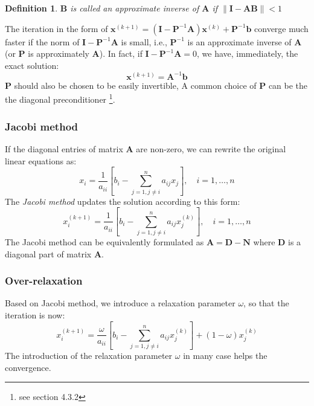 \documentclass{article}
\newtheorem*{definition}{Definition}
\begin{document}
\begin{definition}
    $\mathbf{B}$ is called an approximate inverse of $\mathbf{A}$ if 
    $\|\mathbf{I} - \mathbf{A}\mathbf{B}\| < 1$
\end{definition}
The iteration in the form of 
$\mathbf{x}^{(k+1)} = \left( \mathbf{I} - \mathbf{P}^{-1}\mathbf{A}  \right) \mathbf{x}^{(k)} + \mathbf{P}^{-1} \mathbf{b} $
converge much faster if the norm of $\mathbf{I} - \mathbf{P}^{-1}\mathbf{A}$ is small, 
i.e., $\mathbf{P}^{-1}$ is an approximate inverse of $\mathbf{A}$ (or $\mathbf{P}$ is approximately $\mathbf{A}$). 
In fact, if $\mathbf{I} - \mathbf{P}^{-1}\mathbf{A} = 0$,
we have, immediately, the exact solution:
\begin{equation*}
    \mathbf{x}^{(k+1)} = \mathbf{A}^{-1} \mathbf{b}
\end{equation*}
$\mathbf{P}$ should also be chosen to be easily invertible,
A common choice of $\mathbf{P}$ can be the the diagonal preconditioner
\footnote{see section 4.3.2}. 

\subsubsection{Jacobi method}
If the diagonal entries of matrix $\mathbf{A}$ are non-zero, we can rewrite the 
original linear equations as:
\begin{equation*}
    x_i = \frac{1}{a_{ii}}\left[
        b_i - \sum_{j=1, j\neq i}^n a_{ij}x_j
    \right], \quad i = 1, \dots, n
\end{equation*}
The \emph{Jacobi method} updates the solution according to this form:
\begin{equation}
    x_i^{(k+1)} = \frac{1}{a_{ii}}\left[
        b_i - \sum_{j=1, j\neq i}^n a_{ij}x_j^{(k)}
    \right], \quad i = 1, \dots, n
\end{equation}
The Jacobi method can be equivalently formulated as 
$\mathbf{A} = \mathbf{D} - \mathbf{N}$ where $\mathbf{D}$ is a diagonal part of matrix $\mathbf{A}$.

\subsubsection{Over-relaxation}
Based on Jacobi method, we introduce a relaxation parameter $\omega$, so that 
the iteration is now:
\begin{equation}
    x_i^{(k+1)} = \frac{\omega}{a_{ii}}\left[
        b_i - \sum_{j=1, j\neq i}^n a_{ij}x_j^{(k)}
    \right] + (1-\omega)x_j^{(k)}
\end{equation}
The introduction of the relaxation parameter $\omega$ in many case 
helps the convergence.
\end{document}
